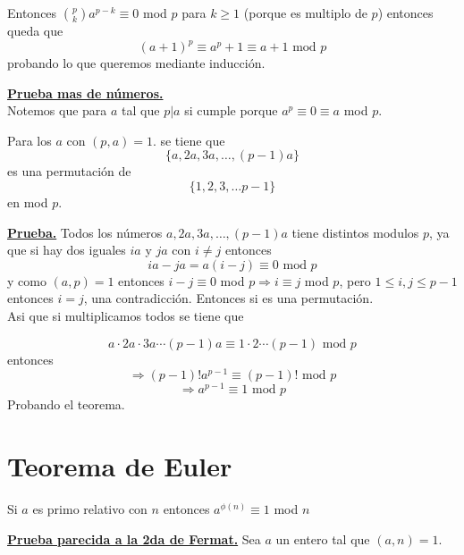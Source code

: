 \documentclass[11pt]{scrartcl}
\begin{document}
Entonces $\binom{p}{k}a^{p-k}\equiv 0$ mod $p$ para $k\geq 1$ (porque es multiplo de $p$) entonces queda que 
$$(a+1)^p\equiv a^p+1 \equiv a+1 \text{ mod } p$$
probando lo que queremos mediante inducción.


\underline{\textbf{Prueba mas de números.}} \\

Notemos que para $a$ tal que $p|a$ si cumple porque $a^p\equiv 0 \equiv a$ mod $p$.

Para los $a$ con $(p,a)=1$. se tiene que 
$$\{a,2a,3a, \ldots, (p-1)a\}$$
es una permutación de 
$$\{1,2,3,\ldots p-1\}$$
en mod $p$. 

\underline{\textbf{Prueba.}} Todos los números $a,2a,3a,\ldots, (p-1)a$ tiene distintos modulos $p$, ya que si hay dos iguales $ia$ y $ja$ con $i\neq j$ entonces 
$$ia-ja= a(i-j) \equiv 0 \text{ mod } p$$
y como $(a,p)=1$ entonces $i-j \equiv 0$ mod $p \Rightarrow i\equiv j$ mod $p$, pero $1\leq i,j \leq p-1$ entonces $i=j$, una contradicción.
Entonces si es una permutación.  \\

Asi que si multiplicamos todos se tiene que 

$$a\cdot 2a\cdot 3a \cdots (p-1)a \equiv 1\cdot 2 \cdots (p-1) \text{ mod } p$$
entonces
$$ \Rightarrow(p-1)!a^{p-1}\equiv (p-1)! \text{ mod } p $$
$$ \Rightarrow a^{p-1}\equiv 1 \text{ mod }p$$
Probando el teorema.

\section{ Teorema de Euler}
\begin{theorem}
 Si $a$ es primo relativo con $n$ entonces $a^{\phi(n)}\equiv 1$ mod $n$
\end{theorem}

\underline{\textbf{Prueba parecida a la 2da de Fermat.}}
Sea $a$ un entero tal que $(a,n)=1$.
\end{document}

